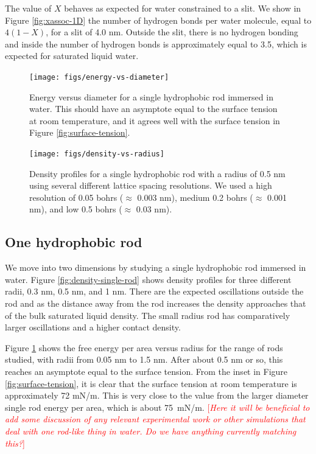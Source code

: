 \documentclass[letterpaper,twocolumn,amsmath,amssymb,prb]{revtex4-1}
\newcommand{\needsworknow}[1]{\textcolor{red}{[\emph{#1}]}}
\begin{document}
The value of $X$ behaves as expected for water constrained to a slit. We
show in Figure \ref{fig:xassoc-1D} the number of hydrogen bonds per water 
molecule, equal to $4(1-X)$, for a slit of 4.0 nm.
Outside the slit, there is no hydrogen bonding and inside the number of hydrogen
bonds is approximately equal to 3.5, which is expected for saturated liquid
water.

\begin{figure}
\begin{center}
\texttt{[image: figs/energy-vs-diameter]}
\end{center}
\caption{ Energy versus diameter for a single hydrophobic rod
immersed in water. This should have an asymptote equal to the surface
tension at room temperature, and it agrees well with the surface tension in
Figure \ref{fig:surface-tension}. }
\label{fig:energy-vs-diameter}
\end{figure}

\begin{figure}
\begin{center}
\texttt{[image: figs/density-vs-radius]}
\end{center}
\caption{ Density profiles for 
a single hydrophobic rod with a radius of 0.5 nm using several different 
lattice spacing resolutions. We used a high resolution of 0.05 bohrs ($\approx$
0.003 nm), 
medium 0.2 bohrs ($\approx$ 0.001 nm), and low 0.5 bohrs ($\approx$ 0.03 nm).}
\label{fig:densityresolution}
\end{figure}

\subsection{One hydrophobic rod}
We move into two dimensions by studying a single hydrophobic rod
immersed in water. Figure \ref{fig:density-single-rod} shows density
profiles for three different radii, 0.3 nm, 0.5 nm, and 1 nm. There are the
expected oscillations outside the rod and as the distance away from the rod
increases
the density approaches that of the bulk saturated liquid density. The small
radius
rod has comparatively larger oscillations and a higher contact density.

Figure \ref{fig:energy-vs-diameter} shows the free energy per area versus
radius for the range of rods studied, with radii from 0.05 nm to 1.5 nm. After 
about 0.5 nm or so, this reaches
an asymptote equal to the surface tension. From the inset in Figure 
\ref{fig:surface-tension}, it is clear that the surface tension at room 
temperature is approximately 72 mN/m. This is very close to the value from
the larger diameter single rod energy per area, which is about 75~mN/m. 
\needsworknow{Here it will be beneficial to add some discussion of any
relevant experimental work or other simulations that deal with one rod-like 
thing in water. Do we have anything currently matching this?}
\end{document}
